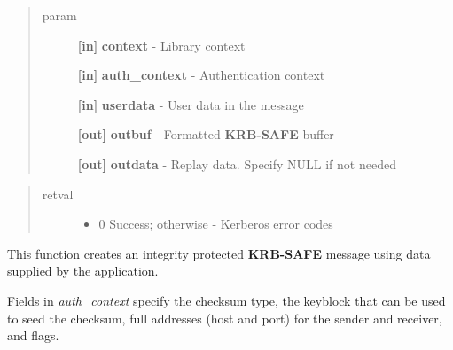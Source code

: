 \documentclass[letterpaper,10pt,english]{sphinxmanual}
\begin{document}
\begin{fulllineitems}
\label{appdev/refs/api/krb5_mk_safe:krb5_mk_safe}
\end{fulllineitems}

\begin{quote}\begin{description}
\item[{param}] \leavevmode
\textbf{{[}in{]}} \textbf{context} - Library context

\textbf{{[}in{]}} \textbf{auth\_context} - Authentication context

\textbf{{[}in{]}} \textbf{userdata} - User data in the message

\textbf{{[}out{]}} \textbf{outbuf} - Formatted \textbf{KRB-SAFE} buffer

\textbf{{[}out{]}} \textbf{outdata} - Replay data. Specify NULL if not needed

\end{description}\end{quote}
\begin{quote}\begin{description}
\item[{retval}] \leavevmode\begin{itemize}
\item {} 
0   Success; otherwise - Kerberos error codes

\end{itemize}

\end{description}\end{quote}

This function creates an integrity protected \textbf{KRB-SAFE} message using data supplied by the application.

Fields in \emph{auth\_context} specify the checksum type, the keyblock that can be used to seed the checksum, full addresses (host and port) for the sender and receiver, and  flags.
\end{document}
